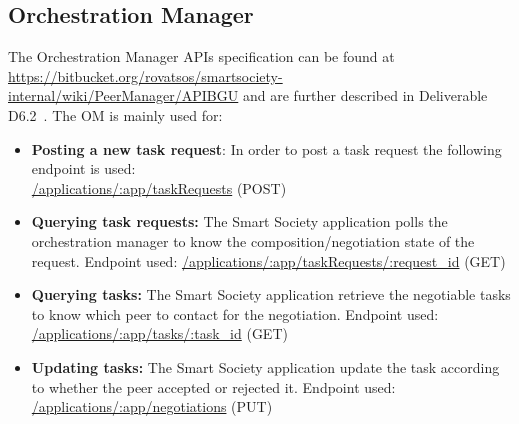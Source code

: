 \subsection{Orchestration Manager}
The Orchestration Manager APIs specification can be found at \url{https://bitbucket.org/rovatsos/smartsociety-internal/wiki/PeerManager/APIBGU} and are further described in Deliverable D6.2~\cite{D6.2}. The OM is mainly used for:
\begin{itemize}
\item {\bf Posting a new task request}: In order to post a task request the following endpoint is used:\\
	\url{/applications/:app/taskRequests} (\textsc{POST})
\item {\bf Querying task requests:} The Smart Society application polls the orchestration manager to know the composition/negotiation state of the request. Endpoint used:
  \url{/applications/:app/taskRequests/:request_id} (\textsc{GET})
\item {\bf Querying tasks:} The Smart Society application retrieve the negotiable tasks to know which peer to contact for the negotiation. Endpoint used:
  \url{/applications/:app/tasks/:task_id} (\textsc{GET})
\item {\bf Updating tasks:} The Smart Society application update the task according to whether the peer accepted or rejected it. Endpoint used:
  \url{/applications/:app/negotiations} (\textsc{PUT})
\end{itemize}
